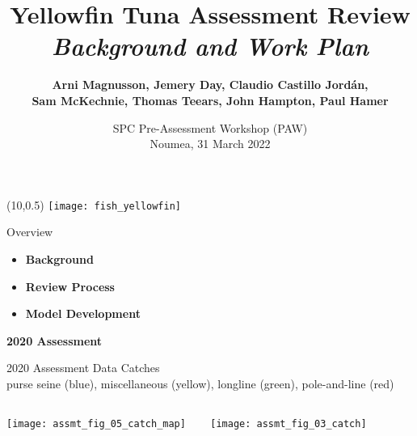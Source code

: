 \documentclass[aspectratio=169]{beamer}
\begin{document}
\begin{frame}
  \title{\vspace{-5ex}\darkblue Yellowfin Tuna Assessment Review\\[2ex]
    \it\large\darkgray Background and Work Plan}
  \author{\vspace{-10ex}\darkgray\bf
    Arni Magnusson, Jemery Day, Claudio Castillo Jordán,\\[0.5ex]
    Sam McKechnie, Thomas Teears, John Hampton, Paul Hamer}
  \date{\darkgreen SPC Pre-Assessment Workshop (PAW)\\[0.5ex]
    Noumea, 31 March 2022}
  \titlepage
  \begin{textblock}{0}(10,0.5)
    \texttt{[image: fish\_yellowfin]}
  \end{textblock}
\end{frame}


\begin{frame}{Overview}
  \begin{itemize}
    \item[] {\bf\darkblue Background} \\[5ex]
    \item[] {\bf\darkblue Review Process} \\[5ex]
    \item[] {\bf\darkblue Model Development} \\[5ex]
  \end{itemize}
\end{frame}


\begin{frame}\Large
  \centering\darkgreen\bf
  2020 Assessment
\end{frame}


\begin{frame}{2020 Assessment Data}\fns
  \vspace{1ex}
  Catches\\[1ex]
  \scriptsize purse seine (blue), miscellaneous (yellow), longline (green),
  pole-and-line (red)\\
  \begin{columns}
    \texttt{[image: assmt\_fig\_05\_catch\_map]}
    ~~~
    \texttt{[image: assmt\_fig\_03\_catch]}
  \end{columns}
\end{frame}
\end{document}
